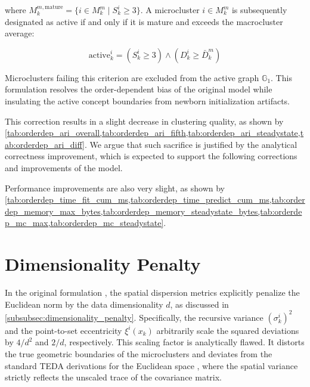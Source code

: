 where $M_k^{m, \text{mature}} = \{i \in M_k^m \mid S_k^i \ge 3\}$. A microcluster $i \in M_k^m$ is subsequently designated as active if and only if it is mature and exceeds the macrocluster average:

\begin{equation}
    \text{active}_k^i = (S_k^i \ge 3) \land (D_k^i \ge \bar{D}_k^m)
    \label{eq:microcluster_activation}
\end{equation}

Microclusters failing this criterion are excluded from the active graph $\mathbb{G}_1$. This formulation resolves the order-dependent bias of the original model while insulating the active concept boundaries from newborn initialization artifacts.

This correction results in a slight decrease in clustering quality, as shown by \cref{tab:orderdep_ari_overall,tab:orderdep_ari_fifth,tab:orderdep_ari_steadystate,tab:orderdep_ari_diff}. We argue that such sacrifice is justified by the analytical correctness improvement, which is expected to support the following corrections and improvements of the model.






Performance improvements are also very slight, as shown by \cref{tab:orderdep_time_fit_cum_ms,tab:orderdep_time_predict_cum_ms,tab:orderdep_memory_max_bytes,tab:orderdep_memory_steadystate_bytes,tab:orderdep_mc_max,tab:orderdep_mc_steadystate}.








\section{Dimensionality Penalty}
\label{sec:dimensionality_penalty}

In the original formulation \cite{maia2020evolvclus}, the spatial dispersion metrics explicitly penalize the Euclidean norm by the data dimensionality $d$, as discussed in \cref{subsubsec:dimensionality_penalty}. Specifically, the recursive variance $\left(\sigma^i_k\right)^2$ and the point-to-set eccentricity $\xi^i(x_k)$ arbitrarily scale the squared deviations by $4/d^2$ and $2/d$, respectively. This scaling factor is analytically flawed. It distorts the true geometric boundaries of the microclusters and deviates from the standard TEDA derivations for the Euclidean space \cite{angelov2014outside}, where the spatial variance strictly reflects the unscaled trace of the covariance matrix.

